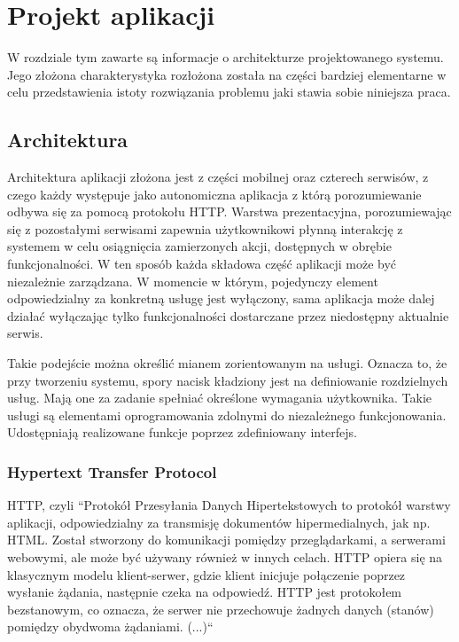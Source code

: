 \chapter{Projekt aplikacji}
W rozdziale tym zawarte są informacje o architekturze projektowanego systemu. Jego złożona charakterystyka rozłożona została na części bardziej elementarne w celu przedstawienia istoty rozwiązania problemu jaki stawia sobie niniejsza praca.

\section{Architektura}

Architektura aplikacji złożona jest z części mobilnej oraz czterech serwisów, z czego każdy występuje jako autonomiczna aplikacja z którą porozumiewanie odbywa się za pomocą protokołu HTTP. Warstwa prezentacyjna, porozumiewając się z pozostałymi serwisami zapewnia użytkownikowi płynną interakcję z systemem w celu osiągnięcia zamierzonych akcji, dostępnych w obrębie funkcjonalności. W ten sposób każda składowa część aplikacji może być niezależnie zarządzana. W momencie w którym, pojedynczy element odpowiedzialny za konkretną usługę jest wyłączony, sama aplikacja może dalej działać wyłączając tylko funkcjonalności dostarczane przez niedostępny aktualnie serwis.

Takie podejście można określić mianem zorientowanym na usługi. Oznacza to, że przy tworzeniu systemu, spory nacisk kładziony jest na definiowanie rozdzielnych usług. Mają one za zadanie spełniać określone wymagania użytkownika. Takie usługi są elementami oprogramowania zdolnymi do niezależnego funkcjonowania. Udostępniają realizowane funkcje poprzez zdefiniowany interfejs.

\subsection{Hypertext Transfer Protocol}
HTTP, czyli ``Protokół Przesyłania Danych Hipertekstowych to protokół warstwy aplikacji, odpowiedzialny za transmisję dokumentów hipermedialnych, jak np. HTML. Został stworzony do komunikacji pomiędzy przeglądarkami, a serwerami webowymi, ale może być używany również w innych celach. HTTP opiera się na klasycznym modelu klient-serwer, gdzie klient inicjuje połączenie poprzez wysłanie żądania, następnie czeka na odpowiedź. HTTP jest protokołem bezstanowym, co oznacza, że serwer nie przechowuje żadnych danych (stanów) pomiędzy obydwoma żądaniami. (...)``~~\cite{http}


